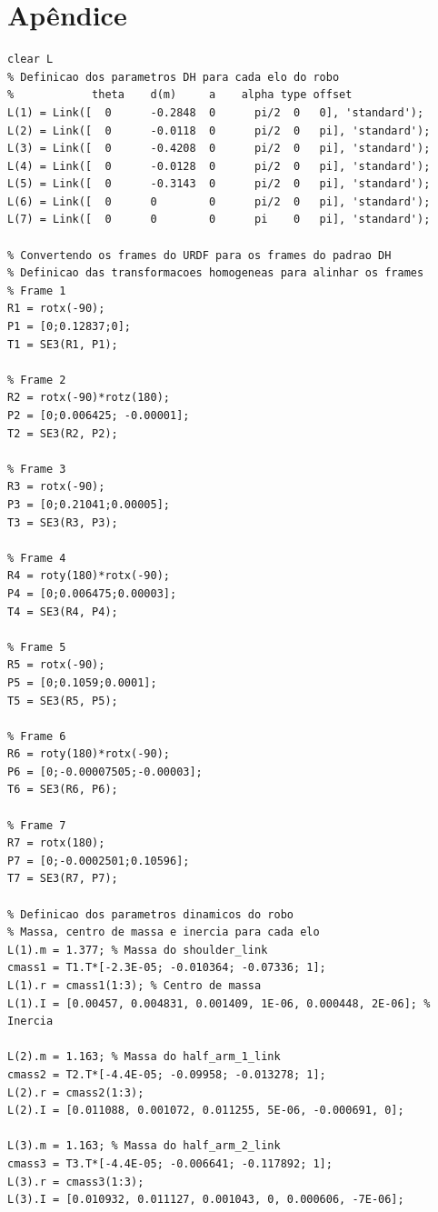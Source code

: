 \documentclass[10pt]{article}
\begin{document}
\newpage

\section*{Apêndice}

\begin{lstlisting}[caption={Código principal do trabalho}, label={code:codigo}]
% Definindo a cinematica direta do Kinova Gen3 usando o padrao DH (Denavit-Hartenberg)
clear L
% Definicao dos parametros DH para cada elo do robo
%            theta    d(m)     a    alpha type offset
L(1) = Link([  0      -0.2848  0      pi/2  0   0], 'standard');
L(2) = Link([  0      -0.0118  0      pi/2  0   pi], 'standard');
L(3) = Link([  0      -0.4208  0      pi/2  0   pi], 'standard');
L(4) = Link([  0      -0.0128  0      pi/2  0   pi], 'standard');
L(5) = Link([  0      -0.3143  0      pi/2  0   pi], 'standard');
L(6) = Link([  0      0        0      pi/2  0   pi], 'standard');
L(7) = Link([  0      0        0      pi    0   pi], 'standard');

% Convertendo os frames do URDF para os frames do padrao DH
% Definicao das transformacoes homogeneas para alinhar os frames
% Frame 1
R1 = rotx(-90);
P1 = [0;0.12837;0];
T1 = SE3(R1, P1);

% Frame 2
R2 = rotx(-90)*rotz(180);
P2 = [0;0.006425; -0.00001];
T2 = SE3(R2, P2);

% Frame 3
R3 = rotx(-90);
P3 = [0;0.21041;0.00005];
T3 = SE3(R3, P3);

% Frame 4
R4 = roty(180)*rotx(-90);
P4 = [0;0.006475;0.00003];
T4 = SE3(R4, P4);

% Frame 5
R5 = rotx(-90);
P5 = [0;0.1059;0.0001];
T5 = SE3(R5, P5);

% Frame 6
R6 = roty(180)*rotx(-90);
P6 = [0;-0.00007505;-0.00003];
T6 = SE3(R6, P6);

% Frame 7
R7 = rotx(180);
P7 = [0;-0.0002501;0.10596];
T7 = SE3(R7, P7);

% Definicao dos parametros dinamicos do robo
% Massa, centro de massa e inercia para cada elo
L(1).m = 1.377; % Massa do shoulder_link
cmass1 = T1.T*[-2.3E-05; -0.010364; -0.07336; 1];
L(1).r = cmass1(1:3); % Centro de massa
L(1).I = [0.00457, 0.004831, 0.001409, 1E-06, 0.000448, 2E-06]; % Inercia

L(2).m = 1.163; % Massa do half_arm_1_link
cmass2 = T2.T*[-4.4E-05; -0.09958; -0.013278; 1];
L(2).r = cmass2(1:3);
L(2).I = [0.011088, 0.001072, 0.011255, 5E-06, -0.000691, 0];

L(3).m = 1.163; % Massa do half_arm_2_link
cmass3 = T3.T*[-4.4E-05; -0.006641; -0.117892; 1];
L(3).r = cmass3(1:3);
L(3).I = [0.010932, 0.011127, 0.001043, 0, 0.000606, -7E-06];


\end{lstlisting}
\end{document}
